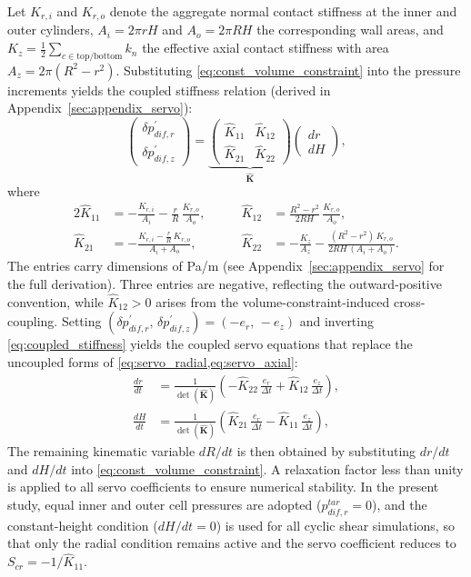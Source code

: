 Let $K_{r,i}$ and $K_{r,o}$ denote the aggregate normal contact stiffness at the inner and outer cylinders, $A_i=2\pi rH$ and $A_o=2\pi RH$ the corresponding wall areas, and $K_z=\frac{1}{2}\sum_{c\in\mathrm{top/bottom}} k_n$ the effective axial contact stiffness with area $A_z=2\pi(R^2-r^2)$. Substituting \cref{eq:const_volume_constraint} into the pressure increments yields the coupled stiffness relation (derived in Appendix~\ref{sec:appendix_servo}):
\begin{equation}
\begin{pmatrix} \delta p_{dif,r}^{\prime} \\[4pt] \delta p_{dif,z}^{\prime} \end{pmatrix}
=
\underbrace{\begin{pmatrix} \hat{K}_{11} & \hat{K}_{12} \\[6pt] \hat{K}_{21} & \hat{K}_{22} \end{pmatrix}}_{\hat{\mathbf{K}}}
\begin{pmatrix} dr \\[4pt] dH \end{pmatrix},
\label{eq:coupled_stiffness}
\end{equation}
where
\begin{alignat}{2}
\hat{K}_{11} &= -\frac{K_{r,i}}{A_i}-\frac{r}{R}\,\frac{K_{r,o}}{A_o}, &\qquad
\hat{K}_{12} &= \frac{R^2-r^2}{2RH}\,\frac{K_{r,o}}{A_o}, \label{eq:Khat_main_row1}\\[4pt]
\hat{K}_{21} &= -\frac{K_{r,i}-\frac{r}{R}\,K_{r,o}}{A_i+A_o}, &\qquad
\hat{K}_{22} &= -\frac{K_z}{A_z}-\frac{(R^2-r^2)\,K_{r,o}}{2RH\,(A_i+A_o)}. \label{eq:Khat_main_row2}
\end{alignat}
The entries carry dimensions of Pa/m (see Appendix~\ref{sec:appendix_servo} for the full derivation). Three entries are negative, reflecting the outward-positive convention, while $\hat{K}_{12}>0$ arises from the volume-constraint-induced cross-coupling. Setting $(\delta p_{dif,r}^{\prime},\,\delta p_{dif,z}^{\prime})=(-e_r,\,-e_z)$ and inverting \cref{eq:coupled_stiffness} yields the coupled servo equations that replace the uncoupled forms of \cref{eq:servo_radial,eq:servo_axial}:
\begin{align}
\frac{dr}{dt} &= \frac{1}{\det(\hat{\mathbf{K}})}\!\left(-\hat{K}_{22}\,\frac{e_r}{\Delta t} + \hat{K}_{12}\,\frac{e_z}{\Delta t}\right), \label{eq:servo_dr}\\[6pt]
\frac{dH}{dt} &= \frac{1}{\det(\hat{\mathbf{K}})}\!\left(\hat{K}_{21}\,\frac{e_r}{\Delta t} - \hat{K}_{11}\,\frac{e_z}{\Delta t}\right), \label{eq:servo_dH}
\end{align}
The remaining kinematic variable $dR/dt$ is then obtained by substituting $dr/dt$ and $dH/dt$ into \cref{eq:const_volume_constraint}. A relaxation factor less than unity is applied to all servo coefficients to ensure numerical stability. In the present study, equal inner and outer cell pressures are adopted ($p_{dif,r}^{tar}=0$), and the constant-height condition ($dH/dt=0$) is used for all cyclic shear simulations, so that only the radial condition remains active and the servo coefficient reduces to $S_{cr}=-1/\hat{K}_{11}$.

